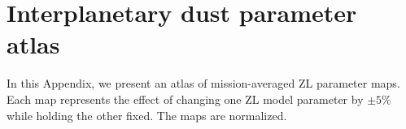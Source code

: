 \documentclass[twocolumn]{aa}
\begin{document}
%



%

\appendix
\onecolumn

\section{Interplanetary dust parameter atlas}
\label{sec:param-atlas}
In this Appendix, we present an atlas of mission-averaged ZL parameter maps.
Each map represents the effect of changing one ZL model parameter by $\pm 5\%$ while holding the other fixed. The maps are normalized.
\end{document}
